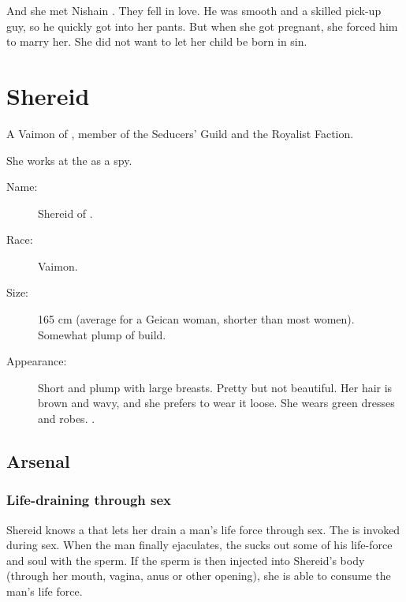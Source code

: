 And she met Nishain \Shireyo. 
They fell in love. 
He was smooth and a skilled pick-up guy, so he quickly got into her pants. 
But when she got pregnant, she forced him to marry her. 
She did not want to let her child be born in sin. 

















\section{Shereid}
A Vaimon of \ClanGeican, member of the Seducers' Guild and the Royalist Faction. 

She works at the \TopazChateau{} as a spy. 



\begin{description}
  \item[Name:] {Shereid} \Kazzed{} of \ClanGeican. 
  \item[Race:] Vaimon. 
  \item[Size:] 
    165 cm (average for a Geican woman, shorter than most \human{} women). Somewhat plump of build. 
  \item[Appearance:] 
    Short and plump with large breasts. Pretty but not beautiful. Her hair is brown and wavy, and she prefers to wear it loose. She wears green dresses and robes. 
    . 
\end{description}









\subsection{Arsenal}
\subsubsection{Life-draining through sex}
Shereid knows a \Qliphah{} that lets her drain a man's life force through sex. The \Qliphah{} is invoked during sex. When the man finally ejaculates, the \Qliphah{} sucks out some of his life-force and soul with the sperm. If the sperm is then injected into Shereid's body (through her mouth, vagina, anus or other opening), she is able to consume the man's life force.

